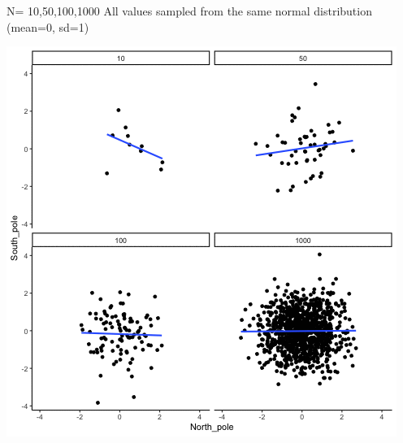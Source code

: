 \documentclass[]{book}
\begin{document}
N= 10,50,100,1000
All values sampled from the same normal distribution (mean=0, sd=1)

\includegraphics{gifs/corNormFourNs-1.gif}
\end{document}
